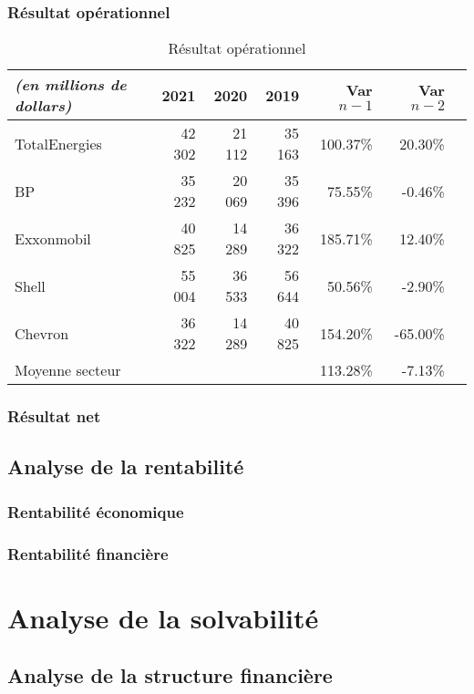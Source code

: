 \documentclass[12pt]{article}
\begin{document}
\subsubsection{Résultat opérationnel}
\begin{table}[H]
    \sffamily
    \centering
    \caption{Résultat opérationnel}
    \label{table:ROC}
    \begin{tabular}{l*{1}{rrrrrr}}
    \toprule
        \textit{(en millions de dollars)} & \textbf{2021} & 2020 & 2019 & Var $n-1$ & Var $n-2$ \\
    \midrule
        TotalEnergies & 42 302	& 21 112 & 35 163  & 100.37\% & 20.30\% \\
    \midrule 
        BP              &   35 232  &   20 069  &   35 396  &   75.55\%	&   -0.46\%  \\
        Exxonmobil	    &   40 825  &   14 289  &   36 322	 &   185.71\%   &   12.40\%  \\
        Shell           &   55 004  &   36 533  &   56 644  &   50.56\%	&   -2.90\%  \\
        Chevron	        &   36 322  &   14 289  &   40 825  &   154.20\%   &   -65.00\% \\
    \midrule
        Moyenne secteur	&   ~      &        ~ &    ~	 &	113.28\%	&   -7.13\%  \\
    \bottomrule
    \end{tabular}
\end{table}
\subsubsection{Résultat net}

\subsection{Analyse de la rentabilité}
\subsubsection{Rentabilité économique}
\subsubsection{Rentabilité financière}

\section{Analyse de la solvabilité}
\subsection{Analyse de la structure financière}
\end{document}
